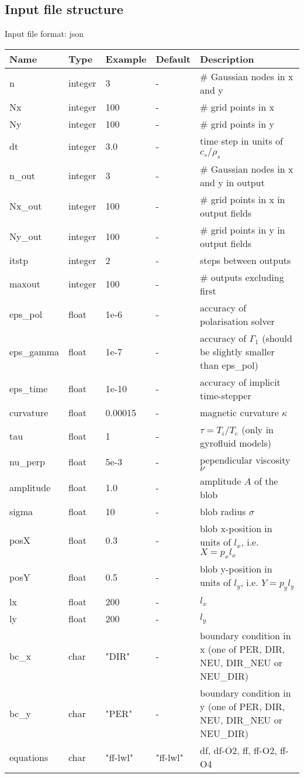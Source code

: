 \subsection{Input file structure}
Input file format: json

\begin{longtable}{llll>{\RaggedRight}p{7cm}}
\toprule
\rowcolor{gray!50}\textbf{Name} &  \textbf{Type} & \textbf{Example} & \textbf{Default} & \textbf{Description}  \\ \midrule
n      & integer & 3 & - &\# Gaussian nodes in x and y \\
Nx     & integer &100& - &\# grid points in x \\
Ny     & integer &100& - &\# grid points in y \\
dt     & integer &3.0& - &time step in units of $c_s/\rho_s$ \\
n\_out  & integer &3  & - &\# Gaussian nodes in x and y in output \\
Nx\_out & integer &100& - &\# grid points in x in output fields \\
Ny\_out & integer &100& - &\# grid points in y in output fields \\
itstp  & integer &2  & - &   steps between outputs \\
maxout & integer &100& - &      \# outputs excluding first \\
eps\_pol   & float &1e-6    & - &  accuracy of polarisation solver \\
eps\_gamma & float &1e-7    & - & accuracy of $\Gamma_1$ (should be slightly smaller than eps\_pol) \\
eps\_time  & float &1e-10   & - & accuracy of implicit time-stepper \\
curvature  & float &0.00015& - & magnetic curvature $\kappa$ \\
tau        & float &1      & - & $\tau = T_i/T_e$ (only in gyrofluid models) \\
nu\_perp    & float &5e-3   & - & pependicular viscosity $\nu$ \\
amplitude  & float &1.0    & - & amplitude $A$ of the blob \\
sigma      & float &10     & - & blob radius $\sigma$ \\
posX       & float &0.3    & - & blob x-position in units of $l_x$, i.e. $X = p_x l_x$\\
posY       & float &0.5    & - & blob y-position in units of $l_y$, i.e. $Y = p_y l_y$ \\
lx         & float &200    & - & $l_x$  \\
ly         & float &200    & - & $l_y$  \\
bc\_x   & char & "DIR"      & - & boundary condition in x (one of PER, DIR, NEU, DIR\_NEU or NEU\_DIR) \\
bc\_y   & char & "PER"      & - & boundary condition in y (one of PER, DIR, NEU, DIR\_NEU or NEU\_DIR) \\
equations  & char & "ff-lwl" & "ff-lwl" &df, df-O2, ff, ff-O2, ff-O4\\
\bottomrule
\end{longtable}

